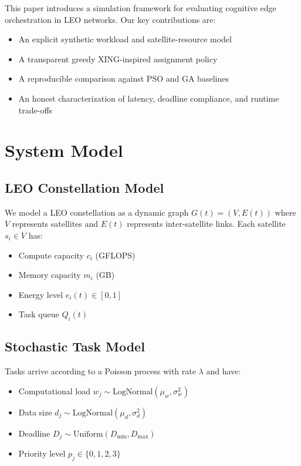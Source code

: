 \documentclass[sigconf]{acmart}
\begin{document}
This paper introduces a simulation framework for evaluating cognitive edge orchestration in LEO networks. Our key contributions are:

\begin{itemize}
\item An explicit synthetic workload and satellite-resource model
\item A transparent greedy XING-inspired assignment policy
\item A reproducible comparison against PSO and GA baselines
\item An honest characterization of latency, deadline compliance, and runtime trade-offs
\end{itemize}

\section{System Model}

\subsection{LEO Constellation Model}

We model a LEO constellation as a dynamic graph $G(t) = (V, E(t))$ where $V$ represents satellites and $E(t)$ represents inter-satellite links. Each satellite $s_i \in V$ has:
\begin{itemize}
\item Compute capacity $c_i$ (GFLOPS)
\item Memory capacity $m_i$ (GB)
\item Energy level $e_i(t) \in [0, 1]$
\item Task queue $Q_i(t)$
\end{itemize}

\subsection{Stochastic Task Model}

Tasks arrive according to a Poisson process with rate $\lambda$ and have:
\begin{itemize}
\item Computational load $w_j \sim \text{LogNormal}(\mu_w, \sigma_w^2)$
\item Data size $d_j \sim \text{LogNormal}(\mu_d, \sigma_d^2)$
\item Deadline $D_j \sim \text{Uniform}(D_{\min}, D_{\max})$
\item Priority level $p_j \in \{0, 1, 2, 3\}$
\end{itemize}
\end{document}
